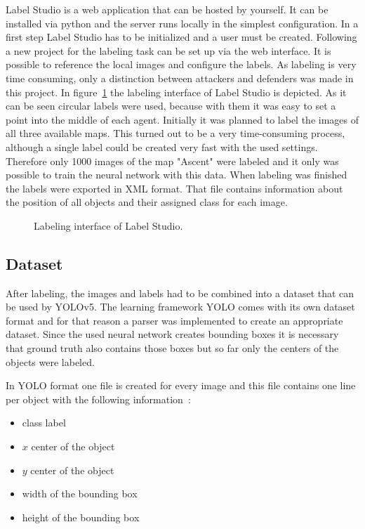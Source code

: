 Label Studio is a web application that can be hosted by yourself. It can be installed via python and 
the server runs locally in the simplest configuration. In a first step Label Studio has to be initialized 
and a user must be created. Following a new project for the labeling task can be set up via the web 
interface. It is possible to reference the local images and configure the labels. As labeling is very 
time consuming, only a distinction between attackers and defenders was made in this project. In 
figure~\ref{fig:app:labelstudio} the labeling interface of Label Studio is depicted. As it can be seen  
circular labels were used, because with them it was easy to set a point into the middle of each 
agent. Initially it was planned to label the images of all three available maps. This turned out to be a 
very time-consuming process, although a single label could be created very fast with the used 
settings. Therefore only 1000 images of the map "Ascent" were labeled and it only was possible to 
train the neural network with this data. When labeling was finished the labels were exported in XML 
format. That file contains information about the position of all objects and their assigned class for 
each image.

\begin{figure}
	\centering
	\caption[Interface of Label Studio.]{Labeling interface of Label Studio.}
	\label{fig:app:labelstudio}
\end{figure}

\subsection{Dataset}\label{subsec:app:dataset}

After labeling, the images and labels had to be combined into a dataset that can be used by 
YOLOv5. The learning framework YOLO comes with its own dataset format and for that reason a 
parser was implemented to create an appropriate dataset. Since the used neural network creates 
bounding boxes it is necessary that ground truth also contains those boxes but so far only the 
centers of the objects were labeled. 

In YOLO format one file is created for every image and this file contains one line per object with the 
following information~\cite{yoloLabels}:

\begin{itemize}
	\item class label
	\item $x$ center of the object
	\item $y$ center of the object
	\item width of the bounding box
	\item height of the bounding box
\end{itemize}

